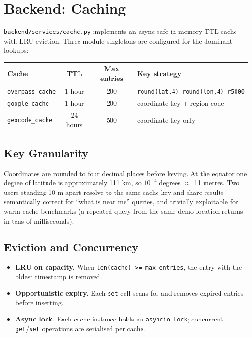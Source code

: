 \documentclass[11pt, a4paper]{article}
\newcommand{\file}[1]{\texttt{\small\color{rsblue}#1}}
\newcommand{\code}[1]{\texttt{\small#1}}
\begin{document}
\section{Backend: Caching}

\file{backend/services/cache.py} implements an async-safe in-memory TTL cache with LRU eviction. Three module singletons are configured for the dominant lookups:

\begin{tabularx}{\textwidth}{l c c X}
\toprule
\textbf{Cache} & \textbf{TTL} & \textbf{Max entries} & \textbf{Key strategy} \\
\midrule
\code{overpass\_cache} & 1 hour & 200 & \code{round(lat,4)\_round(lon,4)\_r5000} \\
\code{google\_cache} & 1 hour & 200 & coordinate key + region code \\
\code{geocode\_cache} & 24 hours & 500 & coordinate key only \\
\bottomrule
\end{tabularx}

\subsection{Key Granularity}

Coordinates are rounded to four decimal places before keying. At the equator one degree of latitude is approximately 111 km, so $10^{-4}$ degrees $\approx$ 11 metres. Two users standing 10 m apart resolve to the same cache key and share results --- semantically correct for ``what is near me'' queries, and trivially exploitable for warm-cache benchmarks (a repeated query from the same demo location returns in tens of milliseconds).

\subsection{Eviction and Concurrency}

\begin{itemize}[leftmargin=*, itemsep=2pt, topsep=2pt]
  \item \textbf{LRU on capacity.} When \code{len(cache) >= max\_entries}, the entry with the oldest timestamp is removed.
  \item \textbf{Opportunistic expiry.} Each \code{set} call scans for and removes expired entries before inserting.
  \item \textbf{Async lock.} Each cache instance holds an \code{asyncio.Lock}; concurrent \code{get}/\code{set} operations are serialised per cache.
\end{itemize}
\end{document}
